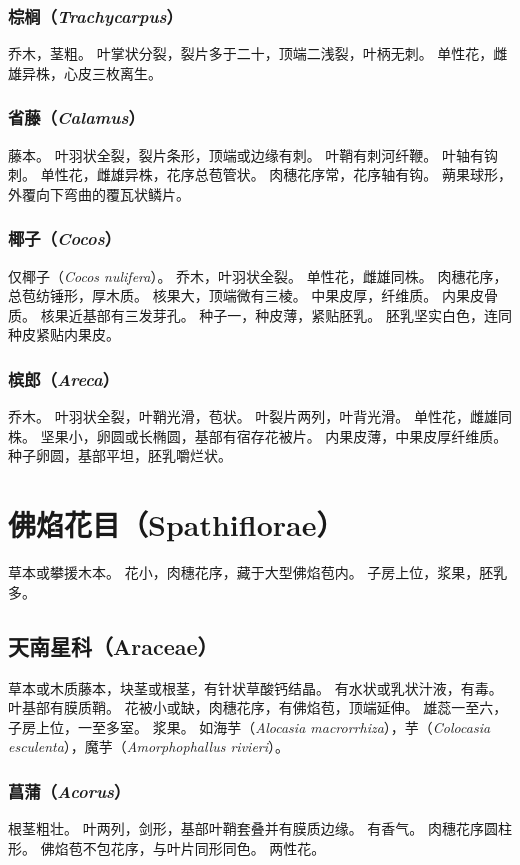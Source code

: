 \documentclass[11pt]{article}
\begin{document}
\begin{sloppypar}
\subsubsection{棕榈（\textit{Trachycarpus}）}
乔木，茎粗。
叶掌状分裂，裂片多于二十，顶端二浅裂，叶柄无刺。
单性花，雌雄异株，心皮三枚离生。

\subsubsection{省藤（\textit{Calamus}）}
藤本。
叶羽状全裂，裂片条形，顶端或边缘有刺。
叶鞘有刺河纤鞭。
叶轴有钩刺。
单性花，雌雄异株，花序总苞管状。
肉穗花序常，花序轴有钩。
蒴果球形，外覆向下弯曲的覆瓦状鳞片。

\subsubsection{椰子（\textit{Cocos}）}
仅椰子（\textit{Cocos nulifera}）。
乔木，叶羽状全裂。
单性花，雌雄同株。
肉穗花序，总苞纺锤形，厚木质。
核果大，顶端微有三棱。
中果皮厚，纤维质。
内果皮骨质。
核果近基部有三发芽孔。
种子一，种皮薄，紧贴胚乳。
胚乳坚实白色，连同种皮紧贴内果皮。

\subsubsection{槟郎（\textit{Areca}）}
乔木。
叶羽状全裂，叶鞘光滑，苞状。
叶裂片两列，叶背光滑。
单性花，雌雄同株。
坚果小，卵圆或长椭圆，基部有宿存花被片。
内果皮薄，中果皮厚纤维质。
种子卵圆，基部平坦，胚乳嚼烂状。

\section{佛焰花目（Spathiflorae）}
草本或攀援木本。
花小，肉穗花序，藏于大型佛焰苞内。
子房上位，浆果，胚乳多。

\subsection{天南星科（Araceae）}
草本或木质藤本，块茎或根茎，有针状草酸钙结晶。
有水状或乳状汁液，有毒。
叶基部有膜质鞘。
花被小或缺，肉穗花序，有佛焰苞，顶端延伸。
雄蕊一至六，子房上位，一至多室。
浆果。
如海芋（\textit{Alocasia macrorrhiza}），芋（\textit{Colocasia esculenta}），魔芋（\textit{Amorphophallus rivieri}）。

\subsubsection{菖蒲（\textit{Acorus}）}
根茎粗壮。
叶两列，剑形，基部叶鞘套叠并有膜质边缘。
有香气。
肉穗花序圆柱形。
佛焰苞不包花序，与叶片同形同色。
两性花。


\end{sloppypar}
\end{document}
